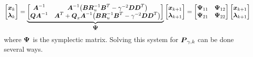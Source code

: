 \begin{equation}
\begin{aligned}
	\begin{bmatrix}
		\vb*{x}_{k}\\ 
		\vb*{\lambda}_{k}
	\end{bmatrix} = \underbrace{
	\begin{bmatrix}
		\vb*{A}^{-1} & \vb*{A}^{-1} \big{(} \vb*{B} \vb*{R}_{u}^{-1} \vb*{B}^{T}
			- \gamma^{-2} \vb*{D}\vb*{D}^{T} \big{)} \\
		\vb*{Q} \vb*{A}^{-1} & \vb*{A}^{T} +\vb*{Q}_{x}\vb*{A}^{-1}
			\big{(} \vb*{B} \vb*{R}_{u}^{-1} \vb*{B}^{T}
			- \gamma^{-2} \vb*{D}\vb*{D}^{T} \big{)}\\
	\end{bmatrix} }_{\text{\normalsize {$\vb*{\Psi}$}}}
	\begin{bmatrix}
		\vb*{x}_{k+1}\\ 
		\vb*{\lambda}_{k+1}
	\end{bmatrix} =
	\begin{bmatrix}
		\vb*{\Psi}_{11} & \vb*{\Psi}_{12}\\
		\vb*{\Psi}_{21} & \vb*{\Psi}_{22}\\
	\end{bmatrix}
	\begin{bmatrix}
		\vb*{x}_{k+1}\\ 
		\vb*{\lambda}_{k+1}
	\end{bmatrix}
\end{aligned}
\end{equation}
where $\vb*{\Psi}$ is the symplectic matrix.  Solving this system for $\vb*{P}_{\gamma,k}$ can be done several ways.


